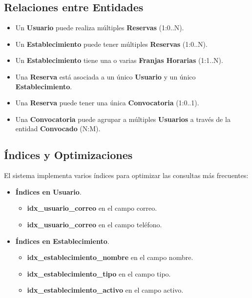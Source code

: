 \subsection{Relaciones entre Entidades}
\begin{itemize}
	\item Un \textbf{Usuario} puede realiza múltiples \textbf{Reservas} (1:0..N).
	\item Un \textbf{Establecimiento} puede tener múltiples \textbf{Reservas} (1:0..N).
	\item Un \textbf{Establecimiento} tiene una o varias \textbf{Franjas Horarias} (1:1..N).
	\item Una \textbf{Reserva} está asociada a un único \textbf{Usuario} y un único \textbf{Establecimiento}.
	\item Una \textbf{Reserva} puede tener una única \textbf{Convocatoria} (1:0..1).
	\item Una \textbf{Convocatoria} puede agrupar a múltiples \textbf{Usuarios} a través de la entidad \textbf{Convocado} (N:M).
\end{itemize}

\newpage

\subsection{Índices y Optimizaciones}

El sistema implementa varios índices para optimizar las consultas más frecuentes:

\begin{itemize}
	\item \textbf{Índices en Usuario}.
	\begin{itemize}
       \item \textbf{idx\_usuario\_correo} en el campo correo.
       \item \textbf{idx\_usuario\_correo} en el campo teléfono.
	\end{itemize}
\end{itemize}

\begin{itemize}
	\item \textbf{Índices en Establecimiento}.
	\begin{itemize}
       \item \textbf{idx\_establecimiento\_nombre} en el campo nombre.
       \item \textbf{idx\_establecimiento\_tipo} en el campo tipo.
       \item \textbf{idx\_establecimiento\_activo} en el campo activo.
	\end{itemize}
\end{itemize}

